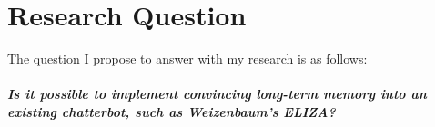 \section*{Research Question}

The question I propose to answer with my research is as follows:\\\\ 
\textbf{\textit{Is it possible to implement convincing long-term memory into an existing chatterbot, such as Weizenbaum's ELIZA?}}